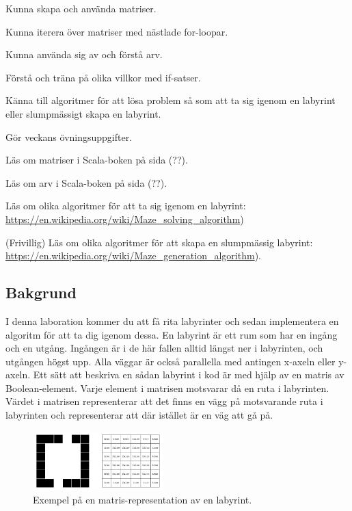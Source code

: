 
\Lab{\LabWeekNINE}

\begin{Goals}
\item Kunna skapa och använda matriser.
\item Kunna iterera över matriser med nästlade for-loopar.
\item Kunna använda sig av och förstå arv.
\item Förstå och träna på olika villkor med if-satser.
\item Känna till algoritmer för att lösa problem så som att ta sig igenom en labyrint eller slumpmässigt skapa en labyrint.
\end{Goals}

\begin{Preparations}
\item Gör veckans övningsuppgifter.
\item Läs om matriser i Scala-boken på sida (??).
\item Läs om arv i Scala-boken på sida (??).
\item Läs om olika algoritmer för att ta sig igenom en labyrint: \url{https://en.wikipedia.org/wiki/Maze\_solving\_algorithm})
\item (Frivillig) Läs om olika algoritmer för att skapa en slumpmässig labyrint: \url{https://en.wikipedia.org/wiki/Maze\_generation\_algorithm}).
\end{Preparations}

\subsection{Bakgrund}

I denna laboration kommer du att få rita labyrinter och sedan implementera en algoritm för att ta dig igenom dessa. En labyrint är ett rum som har en ingång och en utgång. Ingången är i de här fallen alltid längst ner i labyrinten, och utgången högst upp. Alla väggar är också parallella med antingen x-axeln eller y-axeln. Ett sätt att beskriva en sådan labyrint i kod är med hjälp av en matris av Boolean-element. Varje element i matrisen motsvarar då en ruta i labyrinten. Värdet  i matrisen representerar att det finns en vägg på motsvarande ruta i labyrinten och  representerar att där istället är en väg att gå på.


\begin{figure}[h]
	\begin{center}
		\includegraphics[width=0.45\textwidth]{../img/w09-lab/MazeAndMatrix.jpg}
	\end{center}
	\caption{Exempel på en matris-representation av en labyrint.}
\end{figure}

